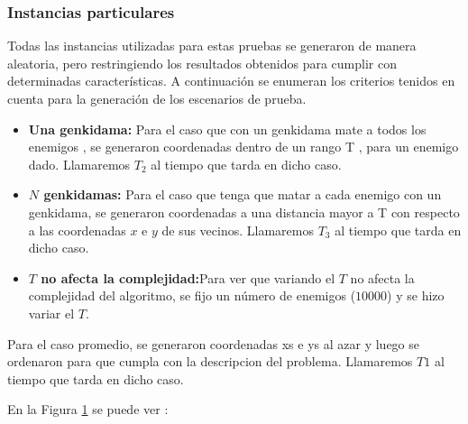         \subsubsection{Instancias particulares}

            Todas las instancias utilizadas para estas pruebas se generaron de manera aleatoria, pero restringiendo los resultados obtenidos para cumplir con determinadas características. A continuación se enumeran los criterios tenidos en cuenta para la generación de los escenarios de prueba.

            \begin{itemize}
                \item \textbf{Una genkidama:} Para el caso que con un genkidama mate a todos los enemigos , se generaron coordenadas dentro de un rango T , para un enemigo dado. Llamaremos $T_2$ al tiempo que tarda en dicho caso.

                \item \textbf{$N$ genkidamas:} Para el caso que tenga que matar a cada enemigo con un genkidama, se generaron coordenadas a una distancia mayor a T con respecto a las coordenadas $x$ e $y$ de sus vecinos. Llamaremos $T_3$ al tiempo que tarda en dicho caso.

                \item \textbf{$T$ no afecta la complejidad:}Para ver que variando el $T$ no afecta la complejidad del algoritmo, se fijo un número de enemigos ($10000$) y se hizo variar el $T$.


            \end{itemize}

   Para el caso promedio, se generaron coordenadas xs e ys al azar y luego se ordenaron para que cumpla con la descripcion del problema. Llamaremos $T1$ al tiempo que tarda en dicho caso.


    \renewcommand\constante{11.5}

	\begin{figure}[H]
		\centering
		\caption{}
		\label{fig:exp2:part_tiempo_base}
	\end{figure}
	En la Figura \ref{fig:exp2:part_tiempo_base} se puede ver :


